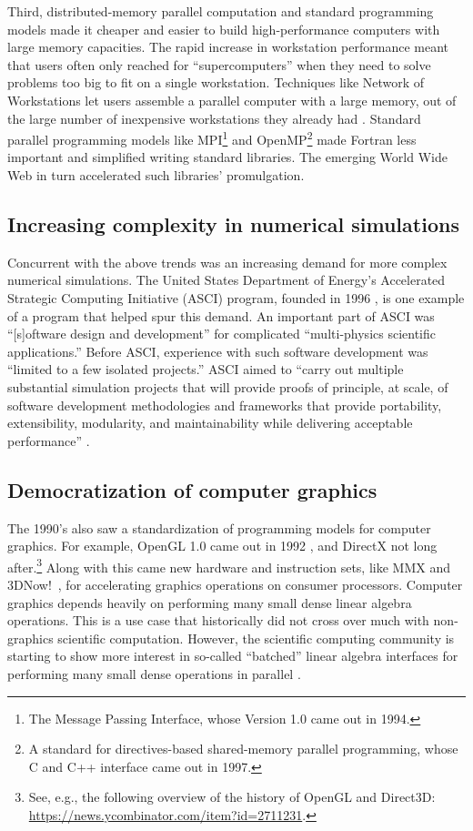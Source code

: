 Third, distributed-memory parallel computation and standard
programming models made it cheaper and easier to build
high-performance computers with large memory capacities.  The rapid
increase in workstation performance meant that users often only
reached for ``supercomputers'' when they need to solve problems too
big to fit on a single workstation.  Techniques like Network of
Workstations let users assemble a parallel computer with a large
memory, out of the large number of inexpensive workstations they
already had \cite{anderson1995case}.  Standard parallel programming
models like MPI\footnote{The Message Passing Interface, whose Version
  1.0 came out in 1994.} and OpenMP\footnote{A standard for
  directives-based shared-memory parallel programming, whose C and C++
  interface came out in 1997.} made Fortran less important and
simplified writing standard libraries.  The emerging World Wide Web in
turn accelerated such libraries' promulgation.

\subsection{Increasing complexity in numerical simulations}
\label{SS:90s:multiphysics}

Concurrent with the above trends was an increasing demand for more
complex numerical simulations.  The United States Department of
Energy's Accelerated Strategic Computing Initiative (ASCI) program,
founded in 1996 \cite{messina1996asci}, is one example of a program
that helped spur this demand.  An important part of ASCI was
``[s]oftware design and development'' for complicated ``multi-physics
scientific applications.''  Before ASCI, experience with such software
development was ``limited to a few isolated projects.''  ASCI aimed to
``carry out multiple substantial simulation projects that will provide
proofs of principle, at scale, of software development methodologies
and frameworks that provide portability, extensibility, modularity,
and maintainability while delivering acceptable performance''
\cite{messina1996asci}.

\subsection{Democratization of computer graphics}
\label{SS:90s:graphics}

The 1990's also saw a standardization of programming models for
computer graphics.  For example, OpenGL 1.0 came out in 1992
\cite{OpenGL-history}, and DirectX not long after.\footnote{See, e.g.,
  the following overview of the history of OpenGL and Direct3D:
  \url{https://news.ycombinator.com/item?id=2711231}.} Along with this
came new hardware and instruction sets, like MMX \cite{mittal1997mmx}
and 3DNow!\ \cite{oberman1999amd}, for accelerating graphics
operations on consumer processors.  Computer graphics depends heavily
on performing many small dense linear algebra operations.  This is a
use case that historically did not cross over much with non-graphics
scientific computation.  However, the scientific computing community
is starting to show more interest in so-called ``batched'' linear
algebra interfaces for performing many small dense operations in
parallel \cite{dongarra2016batched}.


